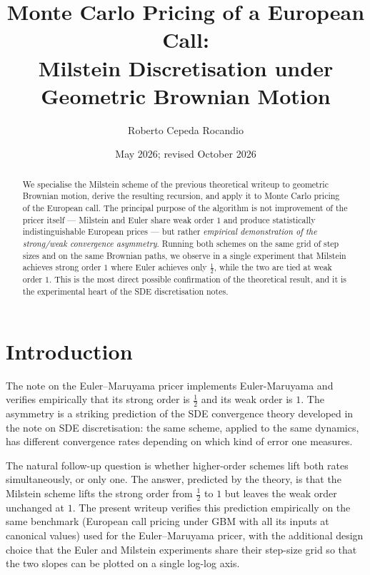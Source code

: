 \documentclass[11pt,a4paper]{article}
\title{Monte Carlo Pricing of a European Call:\\
       Milstein Discretisation under Geometric Brownian Motion}
\author{Roberto Cepeda Rocandio}
\date{May 2026; revised October 2026}
\theoremstyle{plain}
\theoremstyle{definition}
\theoremstyle{remark}
\begin{document}
\maketitle

\begin{abstract}
We specialise the Milstein scheme of the previous theoretical writeup
to geometric Brownian motion, derive the resulting recursion, and
apply it to Monte Carlo pricing of the European call. The principal
purpose of the algorithm is not improvement of the pricer itself ---
Milstein and Euler share weak order $1$ and produce statistically
indistinguishable European prices --- but rather \emph{empirical
demonstration of the strong/weak convergence asymmetry}. Running both
schemes on the same grid of step sizes and on the same Brownian
paths, we observe in a single experiment that Milstein achieves
strong order $1$ where Euler achieves only $\tfrac{1}{2}$, while the
two are tied at weak order $1$. This is the most direct possible
confirmation of the theoretical result, and it is the experimental
heart of the SDE discretisation notes.
\end{abstract}

\tableofcontents

\section{Introduction}
\label{sec:intro}

The note on the Euler--Maruyama pricer implements Euler-Maruyama and
verifies empirically that its strong order is $\tfrac{1}{2}$ and its
weak order is $1$. The asymmetry is a striking prediction of the
SDE convergence theory developed in the note on SDE discretisation: the
same scheme, applied to the same dynamics, has different convergence rates
depending on which kind of error one measures.

The natural follow-up question is whether higher-order schemes lift
both rates simultaneously, or only one. The answer, predicted by the
theory, is that the Milstein scheme lifts the strong order from
$\tfrac{1}{2}$ to $1$ but leaves the weak order unchanged at $1$. The
present writeup verifies this prediction empirically on the same
benchmark (European call pricing under GBM with all its inputs at
canonical values) used for the Euler--Maruyama pricer, with the
additional design
choice that the Euler and Milstein experiments share their step-size
grid so that the two slopes can be plotted on a single log-log axis.
\end{document}
